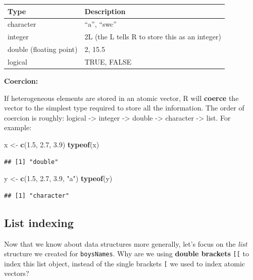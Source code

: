 \documentclass[]{book}
\newenvironment{Shaded}{\begin{snugshade}}{\end{snugshade}}
\newcommand{\FloatTok}[1]{\textcolor[rgb]{0.00,0.00,0.81}{#1}}
\newcommand{\KeywordTok}[1]{\textcolor[rgb]{0.13,0.29,0.53}{\textbf{#1}}}
\newcommand{\NormalTok}[1]{#1}
\newcommand{\StringTok}[1]{\textcolor[rgb]{0.31,0.60,0.02}{#1}}
\begin{document}
\begin{longtable}[]{@{}ll@{}}
\toprule
Type & Description\tabularnewline
\midrule
\endhead
character & ``a'', ``swc''\tabularnewline
integer & 2L (the L tells R to store this as an integer)\tabularnewline
double (floating point) & 2, 15.5\tabularnewline
logical & TRUE, FALSE\tabularnewline
\bottomrule
\end{longtable}

\textbf{Coercion:}

If heterogeneous elements are stored in an atomic vector, R will \textbf{coerce} the vector to the simplest type required to store all the information. The order of coercion is roughly: logical -\textgreater{} integer -\textgreater{} double -\textgreater{} character -\textgreater{} list. For example:

\begin{Shaded}
\begin{Highlighting}[]
\NormalTok{x <-}\StringTok{ }\KeywordTok{c}\NormalTok{(}\FloatTok{1.5}\NormalTok{, }\FloatTok{2.7}\NormalTok{, }\FloatTok{3.9}\NormalTok{)}
\KeywordTok{typeof}\NormalTok{(x)}
\end{Highlighting}
\end{Shaded}

\begin{verbatim}
## [1] "double"
\end{verbatim}

\begin{Shaded}
\begin{Highlighting}[]
\NormalTok{y <-}\StringTok{ }\KeywordTok{c}\NormalTok{(}\FloatTok{1.5}\NormalTok{, }\FloatTok{2.7}\NormalTok{, }\FloatTok{3.9}\NormalTok{, }\StringTok{"a"}\NormalTok{)}
\KeywordTok{typeof}\NormalTok{(y)}
\end{Highlighting}
\end{Shaded}

\begin{verbatim}
## [1] "character"
\end{verbatim}

\hypertarget{list-indexing}{%
\subsection{List indexing}\label{list-indexing}}

Now that we know about data structures more generally, let's focus on the \emph{list} structure we created for \texttt{boysNames}.
Why are we using \textbf{double brackets} \texttt{{[}{[}} to index this list object, instead of the single brackets \texttt{{[}} we used to index atomic vectors?
\end{document}
